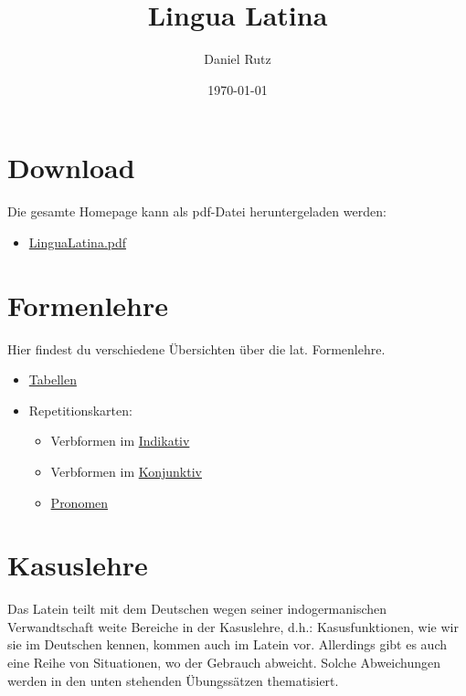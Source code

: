\documentclass{scrartcl}
\author{Daniel Rutz}
\date{\today}
\title{Lingua Latina}
\begin{document}
\maketitle


\section{Download}
\label{sec:orgc696065}
Die gesamte Homepage kann als pdf-Datei heruntergeladen werden:
\begin{itemize}
\item \href{https://www.dropbox.com/s/o6qan4c267z83ze/LinguaLatina.pdf?dl=0}{LinguaLatina.pdf}
\end{itemize}

\section{Formenlehre}
\label{sec:orge9bf09d}
Hier findest du verschiedene Übersichten über die lat. 
Formenlehre.

\begin{itemize}
\item \href{https://www.dropbox.com/s/6mg0r0cdojb8uj4/GrammaticaLatina\_Formenlehre.pdf?dl=0}{Tabellen}
\item Repetitionskarten:
\begin{itemize}
\item Verbformen im \href{https://www.dropbox.com/s/nwnbpxhokzbotzx/RepetitionskartenFormellehreLateinIndikativ.pdf?dl=0}{Indikativ}
\item Verbformen im \href{https://www.dropbox.com/s/rew7e8ofvfnxeup/RepetitionskartenFormellehreLateinKonjunktiv.pdf?dl=0}{Konjunktiv}
\item \href{https://www.dropbox.com/s/pxnj7f8e4cacyuv/RepetitionskartenFormellehreLateinPronomina.pdf?dl=0}{Pronomen}
\end{itemize}
\end{itemize}

\section{Kasuslehre}
\label{sec:org2922b9e}
Das Latein teilt mit dem Deutschen wegen seiner indogermanischen
Verwandtschaft weite Bereiche in der Kasuslehre, d.h.:
Kasusfunktionen, wie wir sie im Deutschen kennen, kommen auch im
Latein vor. Allerdings gibt es auch eine Reihe von Situationen, wo der
Gebrauch abweicht. Solche Abweichungen werden in den unten stehenden
Übungssätzen thematisiert. 
\end{document}
